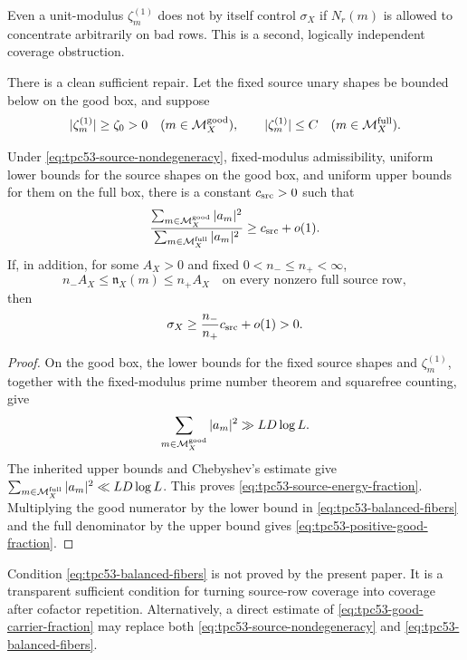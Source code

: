 Even a unit-modulus \(\zeta_m^{(1)}\) does not by itself control
\(\sigma_X\) if \(N_r(m)\) is allowed to concentrate arbitrarily on bad
rows.  This is a second, logically independent coverage obstruction.

There is a clean sufficient repair.  Let the fixed source unary shapes
be bounded below on the good box, and suppose
\begin{equation}
 |\zeta_m^{(1)}|\ge\zeta_0>0
 \quad(m\in\mathcal M_X^{\rm good}),
 \qquad |\zeta_m^{(1)}|\le C
 \quad(m\in\mathcal M_X^{\rm full}).
 \label{eq:tpc53-source-nondegeneracy}
\end{equation}

\begin{proposition}
\label{prop:tpc53-source-energy-coverage}
Under \eqref{eq:tpc53-source-nondegeneracy}, fixed-modulus
admissibility, uniform lower bounds for the source shapes on the good
box, and uniform upper bounds for them on the full box, there is a constant
\(c_{\rm src}>0\) such that
\begin{equation}
 \frac{\sum_{m\in\mathcal M_X^{\rm good}}|a_m|^2}
      {\sum_{m\in\mathcal M_X^{\rm full}}|a_m|^2}
 \ge c_{\rm src}+o(1).
 \label{eq:tpc53-source-energy-fraction}
\end{equation}
If, in addition, for some \(A_X>0\) and fixed
\(0<n_-\le n_+<\infty\),
\begin{equation}
 n_-A_X\le\mathfrak n_X(m)\le n_+A_X
 \quad\text{on every nonzero full source row},
 \label{eq:tpc53-balanced-fibers}
\end{equation}
then
\begin{equation}
 \sigma_X\ge\frac{n_-}{n_+}c_{\rm src}+o(1)>0.
 \label{eq:tpc53-positive-good-fraction}
\end{equation}
\end{proposition}

\begin{proof}
On the good box, the lower bounds for the fixed source shapes and
\(\zeta_m^{(1)}\), together with the fixed-modulus prime number theorem
and squarefree counting, give
\[
 \sum_{m\in\mathcal M_X^{\rm good}}|a_m|^2
 \gg LD\log L.
\]
The inherited upper bounds and Chebyshev's estimate give
\(\sum_{m\in\mathcal M_X^{\rm full}}|a_m|^2\ll LD\log L\).
This proves \eqref{eq:tpc53-source-energy-fraction}.  Multiplying the
good numerator by the lower bound in
\eqref{eq:tpc53-balanced-fibers} and the full denominator by the upper
bound gives \eqref{eq:tpc53-positive-good-fraction}.
\end{proof}

Condition \eqref{eq:tpc53-balanced-fibers} is not proved by the present
paper.  It is a transparent sufficient condition for turning source-row
coverage into coverage after cofactor repetition.  Alternatively, a
direct estimate of \eqref{eq:tpc53-good-carrier-fraction} may replace
both \eqref{eq:tpc53-source-nondegeneracy} and
\eqref{eq:tpc53-balanced-fibers}.
